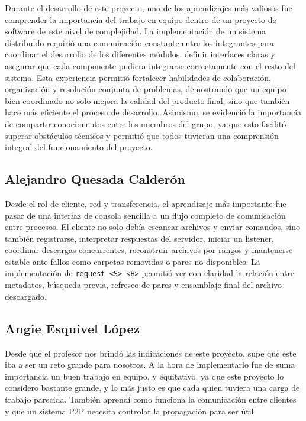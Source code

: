 \documentclass[12pt]{article}
\begin{document}
Durante el desarrollo de este proyecto, uno de los aprendizajes más valiosos fue comprender la importancia del trabajo en equipo dentro de un proyecto de software de este nivel de complejidad. La implementación de un sistema distribuido requirió una comunicación constante entre los integrantes para coordinar el desarrollo de los diferentes módulos, definir interfaces claras y asegurar que cada componente pudiera integrarse correctamente con el resto del sistema. Esta experiencia permitió fortalecer habilidades de colaboración, organización y resolución conjunta de problemas, demostrando que un equipo bien coordinado no solo mejora la calidad del producto final, sino que también hace más eficiente el proceso de desarrollo. Asimismo, se evidenció la importancia de compartir conocimientos entre los miembros del grupo, ya que esto facilitó superar obstáculos técnicos y permitió que todos tuvieran una comprensión integral del funcionamiento del proyecto.

\subsection{Alejandro Quesada Calderón}

Desde el rol de cliente, red y transferencia, el aprendizaje más importante fue
pasar de una interfaz de consola sencilla a un flujo completo de comunicación
entre procesos. El cliente no solo debía escanear archivos y enviar comandos,
sino también registrarse, interpretar respuestas del servidor, iniciar un
listener, coordinar descargas concurrentes, reconstruir archivos por rangos y
mantenerse estable ante fallos como carpetas removidas o pares no disponibles.
La implementación de \verb|request <S> <H>| permitió ver con claridad la relación
entre metadatos, búsqueda previa, refresco de pares y ensamblaje final del
archivo descargado.

\subsection{Angie Esquivel López}

Desde que el profesor nos brindó las indicaciones de este proyecto, supe que este iba a ser un reto grande para nosotros. A la hora de implementarlo fue de suma importancia un buen trabajo en equipo, y equitativo, ya que este proyecto lo considero bastante grande, y lo más justo es que cada quien tuviera una carga de trabajo parecida. También aprendí como funciona la comunicación entre clientes y que un sistema P2P necesita controlar la propagación para ser útil.







\end{document}
